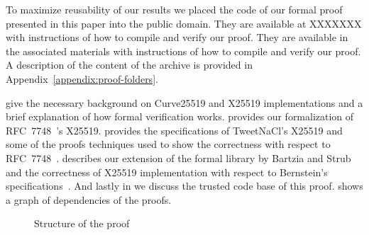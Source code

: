 To maximize reusability of our results we placed the code of our formal proof
presented in this paper into the public domain.
\ifpublic
They are available at XXXXXXX
with instructions of how to compile and verify our proof.
\else
They are available in the associated materials with instructions of how
to compile and verify our proof.
\fi
A description of the content of the archive is provided in
Appendix~\ref{appendix:proof-folders}.

 give the necessary background on Curve25519 and X25519
implementations and a brief explanation of how formal verification works.
 provides our formalization of RFC~7748~\cite{rfc7748}'s X25519.
 provides the specifications of TweetNaCl's X25519 and some of the
proofs techniques used to show the correctness with respect to RFC~7748~\cite{rfc7748}.
 describes our extension of the formal library by Bartzia
and Strub and the correctness of X25519 implementation with respect to Bernstein's
specifications~\cite{Ber14}.
And lastly in  we discuss the trusted code base of this proof.
 shows a graph of dependencies of the proofs.

\begin{figure}[h]
  \centering
  
  \caption{Structure of the proof}
  \label{tikz:ProofOverview}
\end{figure}



%
%

